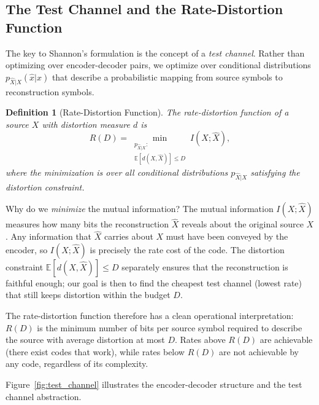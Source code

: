 \documentclass[11pt]{article}
\newtheorem{definition}{Definition}[section]
\newcommand{\RD}{R(D)}
\newcommand{\E}{\mathbb{E}}
\begin{document}
\subsection{The Test Channel and the Rate-Distortion Function}
\label{subsec:test_channel}

The key to Shannon's formulation is the concept of a \emph{test channel}.
Rather than optimizing over encoder-decoder pairs, we optimize over conditional
distributions $p_{\hat{X}|X}(\hat{x}|x)$ that describe a probabilistic mapping
from source symbols to reconstruction symbols.

\begin{definition}[Rate-Distortion Function]
\label{def:rd_function}
The rate-distortion function of a source $X$ with distortion measure $d$ is
\begin{equation}
\label{eq:rd_function}
\RD = \min_{\substack{p_{\hat{X}|X}: \\ \E[d(X, \hat{X})] \leq D}} I(X; \hat{X}),
\end{equation}
where the minimization is over all conditional distributions $p_{\hat{X}|X}$
satisfying the distortion constraint.
\end{definition}

Why do we \emph{minimize} the mutual information?
The mutual information $I(X; \hat{X})$ measures how many bits the reconstruction
$\hat{X}$ reveals about the original source $X$.
Any information that $\hat{X}$ carries about $X$ must have been conveyed by the
encoder, so $I(X; \hat{X})$ is precisely the rate cost of the code.
The distortion constraint $\E[d(X, \hat{X})] \leq D$ separately ensures that the
reconstruction is faithful enough; our goal is then to find the cheapest
test channel (lowest rate) that still keeps distortion within the budget $D$.

The rate-distortion function therefore has a clean operational interpretation:
$\RD$ is the minimum number of bits per source symbol required to describe the
source with average distortion at most $D$.
Rates above $\RD$ are achievable (there exist codes that work), while rates
below $\RD$ are not achievable by any code, regardless of its complexity.

Figure~\ref{fig:test_channel} illustrates the encoder-decoder structure and the
test channel abstraction.
\end{document}
